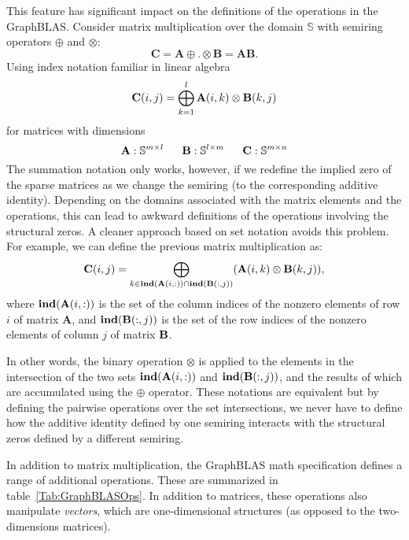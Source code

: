 This feature has significant impact on the definitions of the operations in the GraphBLAS.   
Consider matrix multiplication over the domain $\mathbb{S}$ 
with semiring operators 
$\oplus$ and $\otimes$:
 $$
   \mathbf{C} = \mathbf{A} {\oplus}.{\otimes} \mathbf{B} = \mathbf{A} \mathbf{B}.
$$
Using index notation familiar in linear algebra
  $$
   {\bf C}(i,j) = \bigoplus_{k=1}^l {\bf A}(i,k) \otimes {\bf B}(k,j)
  $$
for matrices with dimensions
$$
  {\bf A} : \mathbb{S}^{m \times l} ~~~~~
  {\bf B} : \mathbb{S}^{l \times m} ~~~~~
  {\bf C} : \mathbb{S}^{m \times n}
$$
The summation notation only works, however, if we redefine the implied zero of the 
sparse matrices as we change the semiring (to the corresponding additive identity).   Depending on the domains associated with the
matrix elements and the operations, this can lead to awkward definitions of the
operations involving the structural zeros.  A cleaner approach based on set notation
avoids this problem.  For example, we can define the previous matrix multiplication
as:   
$$
\mathbf{C}(i,j)
= \bigoplus_{k \in \mathbf{ind}({\bf {A}}(i,:)) \cap
\mathbf{ind}({\bf {B}}(:,j))} ({\bf {A}}(i,k)
\otimes {\bf {B}}(k,j)),
$$ 
where $\mathbf{ind}({\bf {A}}(i,:))$ is the set of the column indices of the 
nonzero elements of row $i$ of matrix $\mathbf{A}$, and
$\mathbf{ind}({\bf {B}}(:,j))$ is the set of the row indices of the 
nonzero elements of column $j$ of matrix ${\bf B}$.

In other words, the binary operation $\otimes$ is applied to the elements in the intersection of the 
two sets $\mathbf{ind}({\bf {A}}(i,:))$ and $\mathbf{ind}({\bf {B}}(:,j))$, and the results of which are accumulated using the $\oplus$ operator.
These notations are equivalent but by defining the pairwise operations over
the set intersections, we never have to define how the additive identity defined by one
semiring interacts with the structural zeros defined by a different semiring.

In addition to matrix multiplication, the GraphBLAS math specification defines
a range of additional operations.  These are summarized in table~\ref{Tab:GraphBLASOps}.
In addition to matrices, these operations also manipulate \emph{vectors}, which are
one-dimensional structures (as opposed to the two-dimensions matrices).

